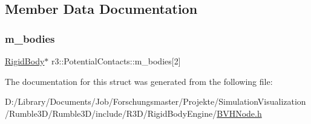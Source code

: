 \subsection{Member Data Documentation}
\mbox{\label{structr3_1_1_potential_contacts_abe9023b80e8adb82b9e2e0cb65527b3b}} 
\subsubsection{\texorpdfstring{m\+\_\+bodies}{m\_bodies}}
{\footnotesize\ttfamily \mbox{\hyperlink{classr3_1_1_rigid_body}{Rigid\+Body}}$\ast$ r3\+::\+Potential\+Contacts\+::m\+\_\+bodies\mbox{[}2\mbox{]}}



The documentation for this struct was generated from the following file\+:\begin{DoxyCompactItemize}
\item 
D\+:/\+Library/\+Documents/\+Job/\+Forschungsmaster/\+Projekte/\+Simulation\+Visualization/\+Rumble3\+D/\+Rumble3\+D/include/\+R3\+D/\+Rigid\+Body\+Engine/\mbox{\hyperlink{_b_v_h_node_8h}{B\+V\+H\+Node.\+h}}\end{DoxyCompactItemize}
